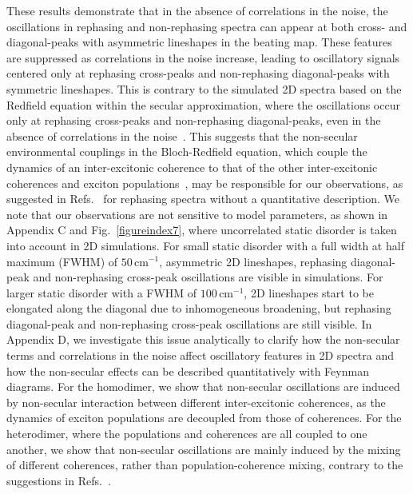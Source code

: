 \documentclass[%
 reprint,%
 amssymb, amsmath,%
 aip,cha,%
]{revtex4-1}
\begin{document}
These results demonstrate that in the absence of correlations in the noise, the oscillations in rephasing and non-rephasing spectra can appear at both cross- and diagonal-peaks with asymmetric lineshapes in the beating map. These features are suppressed as correlations in the noise increase, leading to oscillatory signals centered only at rephasing cross-peaks and non-rephasing diagonal-peaks with symmetric lineshapes. This is contrary to the simulated 2D spectra based on the Redfield equation within the secular approximation, where the oscillations occur only at rephasing cross-peaks and non-rephasing diagonal-peaks, even in the absence of correlations in the noise~\cite{ButkusCPL2012}. This suggests that the non-secular environmental couplings in the Bloch-Redfield equation, which couple the dynamics of an inter-excitonic coherence to that of the other inter-excitonic coherences and exciton populations~\cite{JeskeJCP2015}, may be responsible for our observations, as suggested in Refs.~ for rephasing spectra without a quantitative description.  We note that our observations are not sensitive to model parameters, as shown in Appendix C and Fig.~\ref{figureindex7}, where uncorrelated static disorder is taken into account in 2D simulations. For small static disorder with a full width at half maximum (FWHM) of $50\,$cm$^{-1}$, asymmetric 2D lineshapes, rephasing diagonal-peak and non-rephasing cross-peak oscillations are visible in simulations.  For larger static disorder with a FWHM of $100\,$cm$^{-1}$, 2D lineshapes start to be elongated along the diagonal due to inhomogeneous broadening, but rephasing diagonal-peak and non-rephasing cross-peak oscillations are still visible. In Appendix D, we investigate this issue analytically to clarify how the non-secular terms and correlations in the noise affect oscillatory features in 2D spectra and how the non-secular effects can be described quantitatively with Feynman diagrams. For the homodimer, we show that non-secular oscillations are induced by non-secular interaction between different inter-excitonic coherences, as the dynamics of exciton populations are decoupled from those of coherences. For the heterodimer, where the populations and coherences are all coupled to one another, we show that non-secular oscillations are mainly induced by the mixing of different coherences, rather than population-coherence mixing, contrary to the suggestions in Refs.~.

\end{document}
